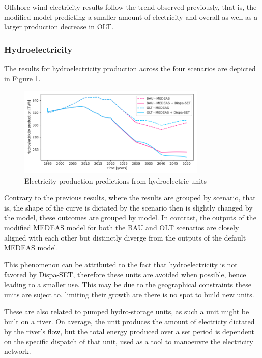 Offshore wind electricity results follow the trend observed previously, that is, the modified model predicting a smaller amount of electricity and overall as well as a larger production decrease in OLT.

\subsubsection{Hydroelectricity}

The results for hydroelectricity production across the four scenarios are depicted in Figure \ref{fig:electricity-production-hydro}.

\begin{figure}[h]
    \centering
    \includegraphics[width=0.8\textwidth]{resources/images/electricity-production-hydro.png}
    \caption{Electricity production predictions from hydroelectric units}
    \label{fig:electricity-production-hydro}
\end{figure}

Contrary to the previous results, where the results are grouped by scenario, that is, the shape of the curve is dictated by the scenario then is slightly changed by the model, these outcomes are grouped by model. In contrast, the outputs of the modified MEDEAS model for both the BAU and OLT scenarios are closely aligned with each other but distinctly diverge from the outputs of the default MEDEAS model.

This phenomenon can be attributed to the fact that hydroelectricity is not favored by Dispa-SET, therefore these units are avoided when possible, hence leading to a smaller use. This may be due to the geographical constraints these units are suject to, limiting their growth are there is no spot to build new units.

These are also related to pumped hydro-storage units, as such a unit might be built on a river. On average, the unit produces the amount of electricty dictated by the river's flow, but the total energy produced over a set period is dependent on the specific dispatch of that unit, used as a tool to manoeuvre the electricity network.

